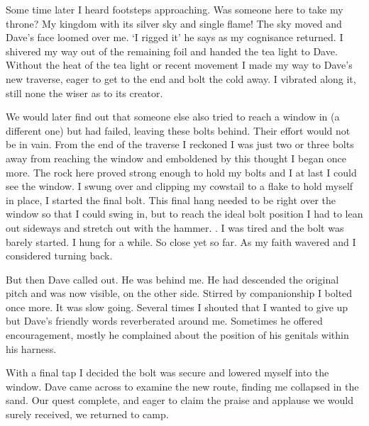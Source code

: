 Some time later I heard footsteps approaching. Was someone here to take my throne? My kingdom with its silver sky and single flame! The sky moved and Dave's face loomed over me.  `I rigged it' he says as my cognisance returned. I shivered my way out of the remaining foil and handed the tea light to Dave. Without the heat of the tea light or recent movement I made my way to Dave's new traverse, eager to get to the end and bolt the cold away. I vibrated along it, still none the wiser as to its creator. 

We would later find out that someone else also tried to reach a window in  (a different one) but had failed, leaving these bolts behind. Their effort would not be in vain. From the end of the traverse I reckoned I was just two or three bolts away from reaching the window and emboldened by this thought I began once more. The rock here proved strong enough to hold my bolts and I at last I could see the window. I swung over and clipping my cowstail to a flake to hold myself in place, I started the final bolt. This final hang needed to be right over the window so that I could swing in, but to reach the ideal bolt position I had to lean out sideways and stretch out with the hammer. . I was tired and the bolt was barely started. I hung for a while. So close yet so far. As my faith wavered and I considered turning back.

But then Dave called out. He was behind me. He had descended the original pitch and was now visible, on the other side. Stirred by companionship I bolted once more. It was slow going. Several times I shouted that I wanted to give up but Dave's friendly words reverberated around me. Sometimes he offered encouragement, mostly he complained about the position of his genitals within his harness. 

With a final tap I decided the bolt was secure and lowered myself into the window. Dave came across to examine the new route, finding me collapsed in the sand. Our quest complete, and eager to claim the praise and applause we would surely received, we returned to camp.

